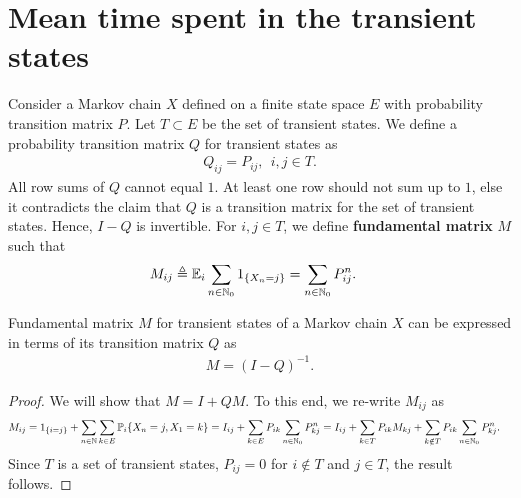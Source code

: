 \documentclass[a4paper,10pt,english]{article}
\begin{document}
\section{Mean time spent in the transient states}
Consider a Markov chain $X$ defined on a finite state space $E$ with probability transition matrix $P$. 
Let $T \subset E$ be the set of transient states. 
We define a probability transition matrix $Q$ for transient states as 
\begin{align*}
Q_{ij} = P_{ij},~~i,j \in T.
\end{align*}
All row sums of $Q$ cannot equal $1$. 
At least one row should not sum up to $1$, else it contradicts the claim that $Q$ is a transition matrix for the set of transient states. 
Hence, $I-Q$ is invertible. 
For $i,j \in T$, we define \textbf{fundamental matrix} $M$ such that
\begin{align*}
M_{ij} &\triangleq \mathbb{E}_i\sum_{n\in \mathbb{N}_0} 1_{\{X_n = j\}} = \sum_{n \in \mathbb{N}_0}P^n_{ij}.
\end{align*}
\begin{lem} 
Fundamental matrix $M$ for transient states of a Markov chain $X$ can be expressed in terms of its transition matrix $Q$ as
\begin{align*}
M = (I - Q)^{-1}.
\end{align*}
\end{lem}
\begin{proof}
We will show that $M = I + QM$. 
To this end, we re-write $M_{ij}$ as 
\begin{align*}
M_{ij} &= 1_{\{i = j\}} + \sum_{n \in \mathbb{N}}\sum_{k \in E}\mathbb{P}_i\{X_n = j, X_1 = k\} = I_{ij} + \sum_{k \in E}P_{ik}\sum_{n \in \mathbb{N}_0}P^n_{kj} = I_{ij} + \sum_{k \in T} P_{ik}M_{kj} + \sum_{k \notin T} P_{ik}\sum_{n \in \mathbb{N}_0}P^n_{kj}.
\end{align*}
Since $T$ is a set of transient states, $P_{ij} = 0$ for $i \notin T$ and $j \in T$, the result follows.  
\end{proof}
\end{document}
